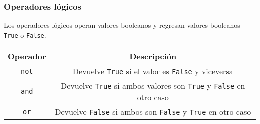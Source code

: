 	\subsubsection{Operadores lógicos}
	Los operadores lógicos operan valores booleanos y regresan valores booleanos \texttt{True} o \texttt{False}.
	\begin{center}
		\begin{tabular}{|c|c|}
			\hline
			Operador & Descripción \\
			\hline
			\texttt{not}& Devuelve \texttt{True} si el valor es \texttt{False} y viceversa \\
			\hline
			\texttt{and}& Devuelve \texttt{True} si ambos valores son \texttt{True} y \texttt{False} en otro caso \\
			\hline
			\texttt{or}& Devuelve \texttt{False} si ambos son \texttt{False} y \texttt{True} en otro caso \\
			\hline
		\end{tabular}
	\end{center}	
